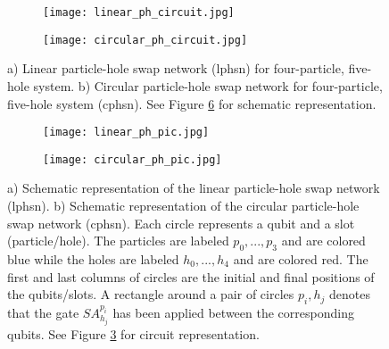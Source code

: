\documentclass[Dual]{msu-thesis}
\begin{document}
\begin{figure}[h]
\begin{centering}
\begin{subfigure}[t]{0.3\textwidth}
\hspace*{-10mm}
\texttt{[image: linear\_ph\_circuit.jpg]}
\caption{}
\label{linear_circuit}
\end{subfigure}
\hspace{4cm}
\begin{subfigure}[t]{0.3\textwidth}
\texttt{[image: circular\_ph\_circuit.jpg]}
\caption{}
\label{circular_circuit}
\end{subfigure}
\caption{a) Linear particle-hole swap network (lphsn) for four-particle, five-hole system. b) Circular particle-hole swap network for four-particle, five-hole system (cphsn). See Figure \ref{fig:dots} for schematic representation.}
\label{fig:circuits}
\end{centering}
\end{figure}

\begin{figure}[h]
\centering
\begin{subfigure}[b]{0.4\textwidth}
\texttt{[image: linear\_ph\_pic.jpg]}
\caption{}
\label{fig:linear_dots}
\end{subfigure}
\begin{subfigure}[b]{0.4\textwidth}
\texttt{[image: circular\_ph\_pic.jpg]}
\caption{}
\label{fig:circular_dots}
\end{subfigure}
\caption{a) Schematic representation of the linear particle-hole swap network (lphsn). b) Schematic representation of the circular particle-hole swap network (cphsn). Each circle represents a qubit and a slot (particle/hole). The particles are labeled $p_0,...,p_3$ and are colored blue while the holes are labeled $h_0,...,h_4$ and are colored red. The first and last columns of circles are the initial and final positions of the qubits/slots. A rectangle around a pair of circles $p_i,h_j$ denotes that the gate $SA^{p_i}_{h_j}$ has been applied between the corresponding qubits. See Figure \ref{fig:circuits} for circuit representation.}
\label{fig:dots}
\end{figure}
\end{document}
